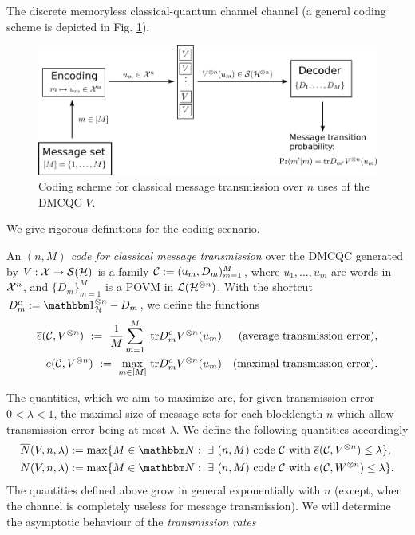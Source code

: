 \begin{section}{The discrete memoryless  classical-quantum channel}
	channel (a general coding scheme is depicted in Fig. \ref{fig:dmcqc_coding_pic}).
	\begin{figure}[ht] 
		\includegraphics[width=\linewidth]{pics/dmcqc_coding_pic}
		\caption{Coding scheme for classical message transmission over $n$ uses of the DMCQC $V$.}\label{fig:dmcqc_coding_pic}
	\end{figure}
	\newpage
	We give rigorous definitions for the coding scenario. 
	\begin{definition} 
		An \emph{$(n,M)$ code for classical message transmission} over the DMCQC generated by $V: {\mathcal X} \rightarrow {\mathcal S}({\mathcal H})$ is a family ${\mathcal C} := (u_m,D_m)_{m=1}^M$, where 
		$u_1,\dots,u_m$ are words in ${\mathcal X}^n$, and $\{D_m\}_{m=1}^M$ is a POVM in ${\mathcal L}({\mathcal H}^{\otimes n})$. 
		With the shortcut $D_m^c := \bbmeins_{\cH}^{\otimes n} - D_m$, we define the functions
		\begin{align*}
		\overline{e}({\mathcal C}, V^{\otimes n}) \ := \ \frac{1}{M} \sum_{m=1}^M \ \mathrm{tr} D_m^c V^{\otimes n}(u_m)   &&\text{(average transmission error)}, \\
		e({\mathcal C}, V^{\otimes n}) \ := \ \underset{m \in [M]}{\max} \ \mathrm{tr} D_m^c V^{\otimes n}(u_m)   &&\text{(maximal transmission error)}.
		\end{align*}
	\end{definition}
	The quantities, which we aim to maximize are, for given transmission error $0 < \lambda < 1$, the maximal size of message sets for each blocklength $n$ which allow transmission error being at most $\lambda$. We define the following quantities accordingly 
	\begin{align*}
	\overline{N}(V,n,\lambda) &:= \max\{M \in \bbmN: \ \exists \ (n,M) \ \text{code} \ \cC \ \text{with} \ \overline{e}(\cC,V^{\otimes n}) \leq \lambda \}, \\
	N(V,n,\lambda) &:= \max\{M \in \bbmN: \ \exists \ (n,M) \ \text{code} \ \cC \ \text{with} \ e(\cC,W^{\otimes n}) \leq \lambda \}.
	\end{align*}
	The quantities defined above grow in general exponentially with $n$ (except, when the channel is completely useless for message transmission). We will determine the asymptotic behaviour of the \emph{transmission rates} 

\end{section}
